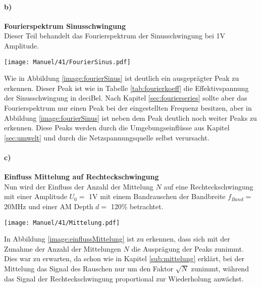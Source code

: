 \paragraph{b)}\textbf{Fourierspektrum Sinusschwingung}\\
Dieser Teil behandelt das Fourierspektrum der Sinusschwingung bei 1V Amplitude.
\begin{center}
    \texttt{[image: Manuel/41/FourierSinus.pdf]}
    \label{image:fourierSinus}
\end{center}
Wie in Abbildung \ref{image:fourierSinus} ist deutlich ein ausgeprägter Peak zu erkennen. Dieser Peak ist wie in Tabelle \ref{tab:fourierkoeff} die Effektivspannung der Sinusschwingung in deciBel. Nach Kapitel \ref{sec:fourierseries} sollte aber das Fourierspektrum nur einen Peak bei der eingestellten Frequenz besitzen, aber in Abbildung \ref{image:fourierSinus} ist neben dem Peak deutlich noch weiter Peaks zu erkennen. Diese Peaks werden durch die Umgebungseinflüsse aus Kapitel \ref{sec:umwelt} und durch die Netzspannungsquelle selbst verursacht.
\newpage
\paragraph{c)}\textbf{Einfluss Mittelung auf Rechteckschwingung}\\
Nun wird der Einfluss der Anzahl der Mittelung $N$ auf eine Rechteckschwingung mit einer Amplitude $U_0=$ 1V mit einem Bandrauschen der Bandbreite $f_{Band}=$ 20MHz und einer AM Depth $d =$ 120\% betrachtet.
\begin{center}
    \texttt{[image: Manuel/41/Mittelung.pdf]}
    \label{image:einflussMittelung}
\end{center}
In Abbildung \ref{image:einflussMittelung} ist zu erkennen, dass sich mit der Zunahme der Anzahl der Mittelungen $N$ die Ausprägung der Peaks zunimmt. Dies war zu erwarten, da schon wie in Kapitel \ref{sub:mittelung} erklärt, bei der Mittelung das Signal des Rauschen nur um den Faktor $\sqrt{N}$ zunimmt, während das Signal der Rechteckschwingung proportional zur Wiederholung anwächst.

